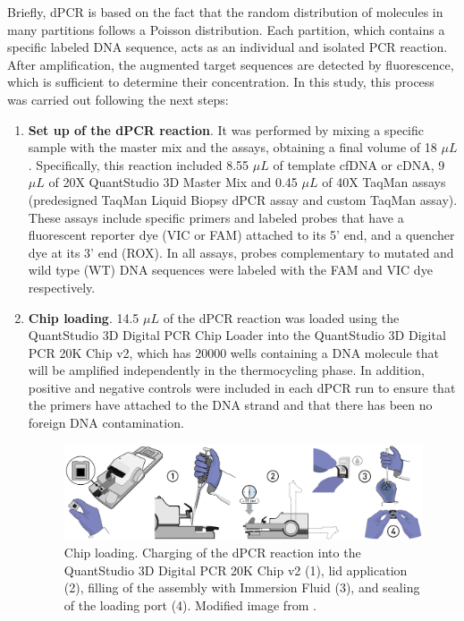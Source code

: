 Briefly, dPCR is based on the fact that the random distribution of molecules in many partitions follows a Poisson distribution. Each partition, which contains a specific labeled DNA sequence, acts as an individual and isolated PCR reaction. After amplification, the augmented target sequences are detected by fluorescence, which is sufficient to determine their concentration. In this study, this process was carried out following the next steps:
\begin{enumerate}[font=\bfseries]
    \item \textbf{Set up of the dPCR reaction}. It was performed by mixing a specific sample with the master mix and the assays, obtaining a final volume of 18 $\mu L$. Specifically, this reaction included 8.55 $\mu L$ of template cfDNA or cDNA, 9 $\mu L$ of 20X QuantStudio\texttrademark{} 3D Master Mix and 0.45 $\mu L$ of 40X TaqMan\texttrademark{} assays (predesigned TaqMan\texttrademark{} Liquid Biopsy dPCR assay and custom TaqMan\texttrademark{} assay). These assays include specific primers and labeled probes that have a fluorescent reporter dye (VIC\texttrademark{} or FAM\texttrademark{}) attached to its 5' end, and a quencher dye at its 3' end (ROX\texttrademark{}). In all assays, probes complementary to mutated and wild type (WT) DNA sequences were labeled with the FAM\texttrademark{} and VIC\texttrademark{} dye respectively.
    \item \textbf{Chip loading}. 14.5 $\mu L$ of the dPCR reaction was loaded using the QuantStudio\texttrademark{} 3D Digital PCR Chip Loader into the QuantStudio\texttrademark{} 3D Digital PCR 20K Chip v2, which has 20000 wells containing a DNA molecule that will be amplified independently in the thermocycling phase. In addition, positive and negative controls were included in each dPCR run to ensure that the primers have attached to the DNA strand and that there has been no foreign DNA contamination.
    \begin{figure}[t]
        \centering
        \includegraphics[width=\textwidth]{Images/chapter_3/chip_loading.png}
        \caption{ Chip loading. Charging of the dPCR reaction into the QuantStudio\texttrademark{} 3D Digital PCR 20K Chip v2 (1), lid application (2), filling of the assembly with Immersion Fluid (3), and sealing of the loading port (4). Modified image from \cite{dPCR_QuantStudio}.}

\end{figure}
\end{enumerate}
